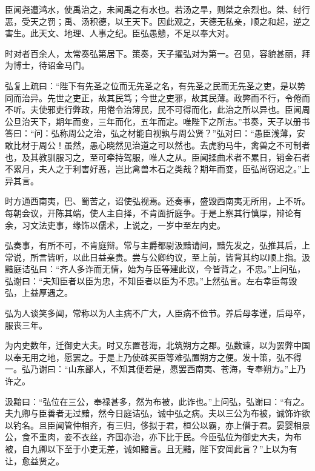 \documentclass[12pt,UTF8]{ctexbook}
\begin{document}
臣闻尧遭鸿水，使禹治之，未闻禹之有水也。若汤之旱，则桀之余烈也。桀、纣行恶，受天之罚；禹、汤积德，以王天下。因此观之，天德无私亲，顺之和起，逆之害生。此天文、地理、人事之纪。臣弘愚戆，不足以奉大对。



时对者百余人，太常奏弘第居下。策奏，天子擢弘对为第一。召见，容貌甚丽，拜为博士，待诏金马门。



弘复上疏曰：“陛下有先圣之位而无先圣之名，有先圣之民而无先圣之吏，是以势同而治异。先世之吏正，故其民笃；今世之吏邪，故其民薄。政弊而不行，令倦而不听。夫使邪吏行弊政，用倦令治薄民，民不可得而化，此治之所以异也。臣闻周公旦治天下，期年而变，三年而化，五年而定。唯陛下之所志。”书奏，天子以册书答曰：“问：弘称周公之治，弘之材能自视孰与周公贤？”弘对曰：“愚臣浅薄，安敢比材于周公！虽然，愚心晓然见治道之可以然也。去虎豹马牛，禽兽之不可制者也，及其教驯服习之，至可牵持驾服，唯人之从。臣闻揉曲术者不累日，销金石者不累月，夫人之于利害好恶，岂比禽兽木石之类哉？期年而变，臣弘尚窃迟之。”上异其言。



时方通西南夷，巴、蜀苦之，诏使弘视焉。还奏事，盛毁西南夷无所用，上不听。每朝会议，开陈其端，使人主自择，不肯面折庭争。于是上察其行慎厚，辩论有余，习文法吏事，缘饰以儒术，上说之，一岁中至左内史。



弘奏事，有所不可，不肯庭辩。常与主爵都尉汲黯请间，黯先发之，弘推其后，上常说，所言皆听，以此日益亲贵。尝与公卿约议，至上前，皆背其约以顺上指。汲黯庭诘弘曰：“齐人多诈而无情，始为与臣等建此议，今皆背之，不忠。”上问弘，弘谢曰：“夫知臣者以臣为忠，不知臣者以臣为不忠。”上然弘言。左右幸臣每毁弘，上益厚遇之。



弘为人谈笑多闻，常称以为人主病不广大，人臣病不俭节。养后母孝谨，后母卒，服丧三年。



为内史数年，迁御史大夫。时又东置苍海，北筑朔方之郡。弘数谏，以为罢弊中国以奉无用之地，愿罢之。于是上乃使硃买臣等难弘置朔方之便。发十策，弘不得一。弘乃谢曰：“山东鄙人，不知其便若是，愿罢西南夷、苍海，专奉朔方。”上乃许之。



汲黯曰：“弘位在三公，奉禄甚多，然为布被，此诈也。”上问弘，弘谢曰：“有之。夫九卿与臣善者无过黯，然今日庭诘弘，诚中弘之病。夫以三公为布被，诚饰诈欲以钓名。且臣闻管仲相齐，有三归，侈拟于君，桓公以霸，亦上僭于君。晏婴相景公，食不重肉，妾不衣丝，齐国亦治，亦下比于民。今臣弘位为御史大夫，为布被，自九卿以下至于小吏无差，诚如黯言。且无黯，陛下安闻此言？”上以为有让，愈益贤之。
\end{document}

